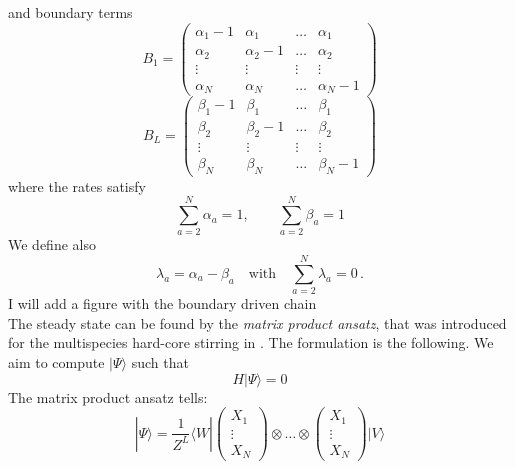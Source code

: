 \documentclass[11pt]{article}
\numberwithin{equation}{subsection}
\begin{document}
and boundary terms 
\begin{equation}
	B_{1}=\begin{pmatrix}
		\alpha_{1}-1&\alpha_{1}&\ldots&\alpha_{1}\\
		\alpha_{2}&\alpha_{2}-1&\ldots&\alpha_{2}\\
		\vdots&\vdots&\vdots&\vdots\\
		\alpha_{N}&\alpha_{N}&\ldots&\alpha_{N}-1
	\end{pmatrix}
\end{equation}
\begin{equation}
	B_{L}=\begin{pmatrix}
		\beta_{1}-1&\beta_{1}&\ldots&\beta_{1}\\
		\beta_{2}&\beta_{2}-1&\ldots&\beta_{2}\\
		\vdots&\vdots&\vdots&\vdots\\
		\beta_{N}&\beta_{N}&\ldots&\beta_{N}-1
	\end{pmatrix}
\end{equation}
where the rates satisfy
\begin{equation}\label{ratesConditions}
	\sum_{a=2}^{N}\alpha_{a}=1,\qquad\sum_{a=2}^{N}\beta_{a}=1
\end{equation} 
We define also 
\begin{equation}\label{lambdaConditions}
	\lambda_{a}=\alpha_{a}-\beta_{a}\quad\text{with}\quad \sum_{a=2}^{N}\lambda_{a}=0\,.
\end{equation}
{\color{red} I will add a figure with the boundary driven chain}\\
The steady state can be found by the \textit{matrix product ansatz}, that was introduced for the multispecies hard-core stirring in \cite{vanicat2017exact}. The formulation is the following. We aim to compute $|\Psi\rangle$ such that 
\begin{equation}
	H|\Psi\rangle =0
\end{equation}
The matrix product ansatz tells:
\begin{equation}
	|\Psi\rangle=\frac{1}{Z^{L}}\langle W|\begin{pmatrix}
		X_{1}\\
		\vdots\\
		X_{N}
	\end{pmatrix}\otimes \ldots\otimes \begin{pmatrix}
		X_{1}\\
		\vdots\\
		X_{N}
	\end{pmatrix}|V\rangle
\end{equation}
\end{document}

